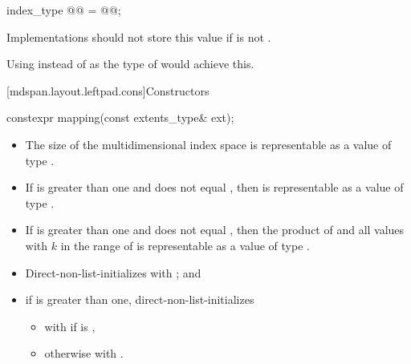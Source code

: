 \begin{itemdecl}
index_type @@ = @@;
\end{itemdecl}

\begin{itemdescr}
\pnum
\recommended
Implementations should not store this value
if  is not .
\begin{note}
Using  instead of
 as the type of  would achieve this.
\end{note}
\end{itemdescr}

[mdspan.layout.leftpad.cons]{Constructors}

%
\begin{itemdecl}
constexpr mapping(const extents_type& ext);
\end{itemdecl}

\begin{itemdescr}
\pnum
\expects
\begin{itemize}
\item
The size of the multidimensional index space  is representable as
a value of type .
\item
If  is greater than one and
 does not equal ,
then 
is representable as a value of type .
\item
If  is greater than one and
 does not equal ,
then the product of
 and
all values 
with $k$ in the range of 
is representable as a value of type .
\end{itemize}

\pnum
\effects
\begin{itemize}
\item
Direct-non-list-initializes  with ; and
\item
if  is greater than one,
direct-non-list-initializes 
\begin{itemize}
\item
with  if  is ,
\item
otherwise with
.
\end{itemize}
\end{itemize}
\end{itemdescr}

